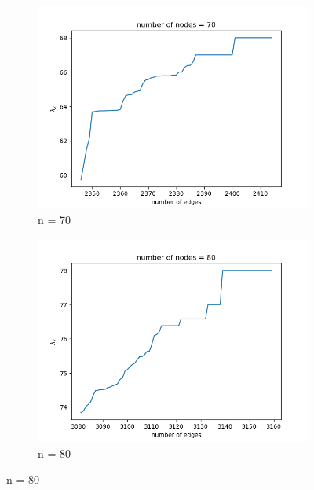 \documentclass{article}
\begin{document}
\begin{problem}
\begin{figure}[!h]
\begin{subfigure}{0.35\textwidth}
        \includegraphics[width=\textwidth]{./img/p5_node70.png}
        \caption{n = 70 }
    \end{subfigure}
    \begin{subfigure}{0.35\textwidth}
        \includegraphics[width=\textwidth]{./img/p5_node80.png}
        \caption{n = 80 }
    \end{subfigure}


\end{figure}
\end{problem}
\end{document}
